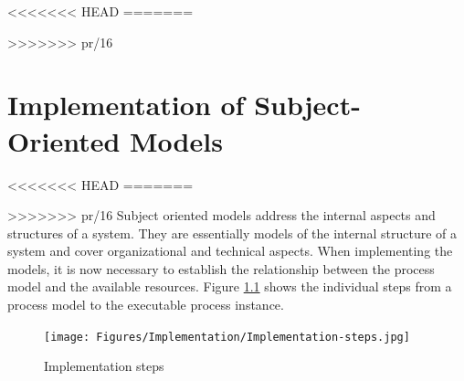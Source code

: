 <<<<<<< HEAD
=======
%




>>>>>>> pr/16

\chapter{Implementation of Subject-Oriented Models}

<<<<<<< HEAD
=======



>>>>>>> pr/16
Subject oriented models address the internal aspects and structures of a system. They are essentially models of the internal structure of a system and cover organizational and technical aspects. When implementing the models, it is now necessary to establish the relationship between the process model and the available resources. Figure \ref{fig:Implementation-steps} shows the individual steps from a process model to the executable process instance.

\begin{figure}[h]
	\centering
	\texttt{[image: Figures/Implementation/Implementation-steps.jpg]}
	\caption[Implementation steps]{Implementation steps}
	\label{fig:Implementation-steps}
\end{figure}
 
